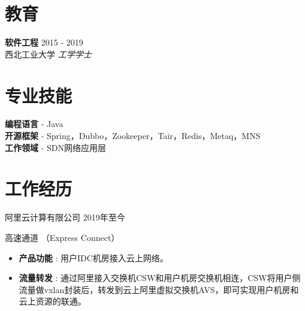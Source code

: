 \documentclass[margin, centered]{res}
\begin{document}
    \begin{resume}

        \section{教育}
        \textbf{软件工程} \hfill 2015 - 2019 \\
        { 西北工业大学 \textit{工学学士} }


        \section{专业技能}

        \textbf{编程语言} - Java \\
        \textbf{开源框架} - Spring，Dubbo，Zookeeper，Tair，Redis，Metaq，MNS\\
        \textbf{工作领域} - SDN网络应用层 \\


        \section{工作经历}
        阿里云计算有限公司  \hfill 2019年至今


        高速通道  （Express Connect）
        \\
        \begin{itemize}[leftmargin=*]


            \item \textbf{{产品功能 }}: 用户IDC机房接入云上网络。

            \item \textbf{{流量转发}} : 通过阿里接入交换机CSW和用户机房交换机相连，CSW将用户侧流量做vxlan封装后，转发到云上阿里虚拟交换机AVS，即可实现用户机房和云上资源的联通。

        \end{itemize}




\end{resume}
\end{document}
